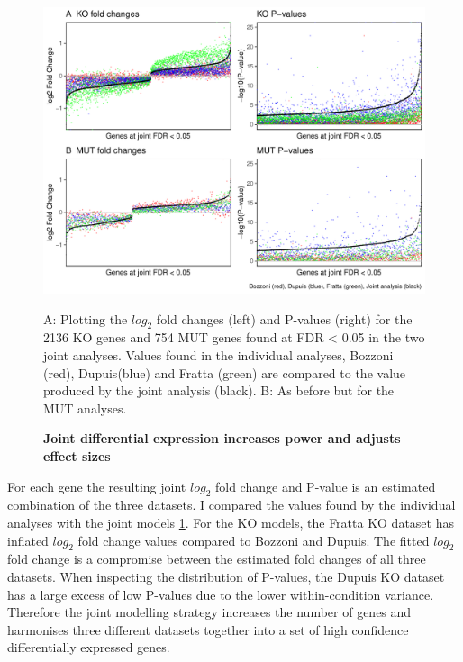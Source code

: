 \begin{figure}[h!]
	\centering
	\includegraphics[width=\textwidth]{Figures/06_fus_meta/fitted_vs_individual_p_lfc.pdf}
	\caption{\textbf{Joint differential expression increases power and adjusts effect sizes}}
	A: Plotting the $log_2$ fold changes (left) and P-values (right) for the 2136 KO genes and 754 MUT genes found at FDR < 0.05 in the two joint analyses. Values found in the individual analyses, Bozzoni (red), Dupuis(blue) and Fratta (green) are compared to the value produced by the joint analysis (black).
	B: As before but for the MUT analyses.
	\label{fig:value_comparison}
\end{figure}

For each gene the resulting joint $log_2$ fold change and P-value is an estimated combination of the three datasets.
I compared the values found by the individual analyses with the joint models \ref{fig:value_comparison}.
For the KO models, the Fratta KO dataset has inflated $log_2$ fold change values compared to Bozzoni and Dupuis. 
The fitted $log_2$ fold change is a compromise between the estimated fold changes of all three datasets. 
When inspecting the distribution of P-values, the Dupuis KO dataset has a large excess of low P-values due to the lower within-condition variance.
Therefore the joint modelling strategy increases the number of genes and harmonises three different datasets together into a set of high confidence differentially expressed genes.


